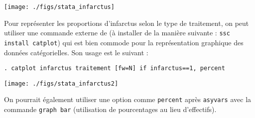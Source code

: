 \texttt{[image: ./figs/stata\_infarctus]}

Pour représenter les proportions d'infarctus selon le type de traitement, on
peut utiliser une commande externe de \Stata (à installer de la manière
suivante : \verb|ssc install catplot|) qui est bien commode pour la
représentation graphique des données catégorielles. Son usage est le suivant :
\begin{verbatim}
. catplot infarctus traitement [fw=N] if infarctus==1, percent
\end{verbatim}

\texttt{[image: ./figs/stata\_infarctus2]}

On pourrait également utiliser une option comme \texttt{percent} après
\texttt{asyvars} avec la commande \texttt{graph bar} (utilisation de
pourcentages au lieu d'effectifs). 

